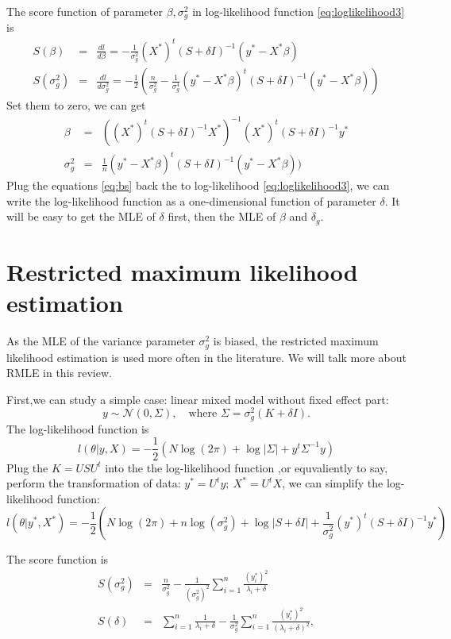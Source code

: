 \documentclass[12pt]{article}
\def\N{\mathcal{N}}
\numberwithin{equation}{section}
\begin{document}
The score function of parameter $\beta, \sigma_g^2$ in log-likelihood function \ref{eq:loglikelihood3} is
\[
\begin{array}{lcl}
S(\beta)&=& \frac{dl}{d\beta}=-\frac{1}{\sigma_g^2}(X^*)^t(S+\delta I)^{-1}(y^*-X^*\beta)\\
S(\sigma_g^2) &=& \frac{dl}{d\sigma_g^2}=-\frac{1}{2}(\frac{n}{\sigma_g^2}-\frac{1}{\sigma_g^4}(y^*-X^*\beta)^t(S+\delta I)^{-1}(y^*-X^*\beta))
\end{array}
\]
Set them to zero, we can get
\begin{equation}
\label{eq:bs}
\begin{array}{lcl}
\beta &=& ((X^*)^t(S+\delta I)^{-1}X^*)^{-1}(X^*)^t(S+\delta I)^{-1}y^*\\
\sigma_g^2 &=& \frac{1}{n}(y^*-X^*\beta)^t(S+\delta I)^{-1}(y^*-X^*\beta))
\end{array}
\end{equation}
Plug the equations \ref{eq:bs} back the to log-likelihood \ref{eq:loglikelihood3}, we can write the log-likelihood function as a one-dimensional function of parameter $\delta$. It will be easy to get the MLE of $\delta$ first, then the MLE of $\beta$ and $\delta_g$.

\section{Restricted maximum likelihood estimation}
As the MLE of the variance parameter $\sigma_g^2$ is biased, the restricted maximum likelihood estimation is used more often in the literature. We will talk more about RMLE in this review. 

First,we can study a simple case: linear mixed model without fixed effect part:
\[
y \sim \N(0,\Sigma), \quad \text{where }\Sigma=\sigma_g^2(K+\delta I).
\]
The log-likelihood function is
\[
l(\theta|y,X)=-\frac{1}{2}(N\log(2\pi)+\log|\Sigma|+y^t\Sigma^{-1}y)
\]
Plug the $K=USU^t$ into the the log-likelihood function ,or equvaliently to say, perform the transformation of data: $y^*=U^ty;\ X^*=U^tX$, we can simplify the log-likelihood function:
\[
l(\theta|y^*,X^*)=-\frac{1}{2}(N\log(2\pi)+n\log(\sigma_g^2)+\log|S+\delta I|+\frac{1}{\sigma_g^2} (y^*)^t(S+\delta I)^{-1}y^*)
\]

The score function is 
\[
\begin{array}{lcl}
S(\sigma_g^2) &=& \frac{n}{\sigma_g^2}-\frac{1}{(\sigma_g^2)^2} \sum_{i=1}^n \frac{(y_i^*)^2}{\lambda_i+\delta} \\
S(\delta) &=& \sum_{i=1}^n \frac{1}{\lambda_i+\delta}-\frac{1}{\sigma_g^2}\sum_{i=1}^n \frac{(y_i^*)^2}{(\lambda_i+\delta)^2},
\end{array}
\]
\end{document}
